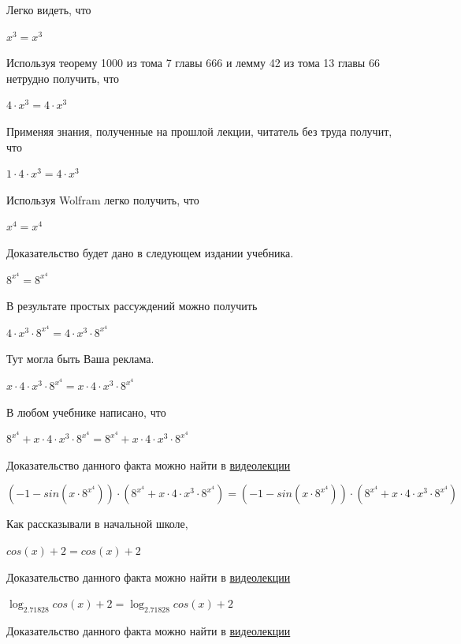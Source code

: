 \documentclass[12pt,a4paper,fleqn]{article}
\theoremstyle{definition}
\begin{document}
Легко видеть, что 

${ x }^{ 3 } = { x }^{ 3 }$

Используя теорему 1000 из тома 7 главы 666 и лемму 42 из тома 13 главы 66 нетрудно получить, что 

$ 4  \cdot { x }^{ 3 } =  4  \cdot { x }^{ 3 }$

Применяя знания, полученные на прошлой лекции, читатель без труда получит, что 

$ 1  \cdot  4  \cdot { x }^{ 3 } =  4  \cdot { x }^{ 3 }$

Используя Wolfram легко получить, что 

${ x }^{ 4 } = { x }^{ 4 }$

Доказательство будет дано в следующем издании учебника. 

${ 8 }^{{ x }^{ 4 }} = { 8 }^{{ x }^{ 4 }}$

В результате простых рассуждений можно получить 

$ 4  \cdot { x }^{ 3 } \cdot { 8 }^{{ x }^{ 4 }} =  4  \cdot { x }^{ 3 } \cdot { 8 }^{{ x }^{ 4 }}$

Тут могла быть Ваша реклама. 

$ x  \cdot  4  \cdot { x }^{ 3 } \cdot { 8 }^{{ x }^{ 4 }} =  x  \cdot  4  \cdot { x }^{ 3 } \cdot { 8 }^{{ x }^{ 4 }}$

В любом учебнике написано, что 

${ 8 }^{{ x }^{ 4 }} +  x  \cdot  4  \cdot { x }^{ 3 } \cdot { 8 }^{{ x }^{ 4 }} = { 8 }^{{ x }^{ 4 }} +  x  \cdot  4  \cdot { x }^{ 3 } \cdot { 8 }^{{ x }^{ 4 }}$

Доказательство данного факта можно найти в \href{https://www.youtube.com/watch?v=dQw4w9WgXcQ}{видеолекции} 

$( -1  - sin( x  \cdot { 8 }^{{ x }^{ 4 }})) \cdot ({ 8 }^{{ x }^{ 4 }} +  x  \cdot  4  \cdot { x }^{ 3 } \cdot { 8 }^{{ x }^{ 4 }}) = ( -1  - sin( x  \cdot { 8 }^{{ x }^{ 4 }})) \cdot ({ 8 }^{{ x }^{ 4 }} +  x  \cdot  4  \cdot { x }^{ 3 } \cdot { 8 }^{{ x }^{ 4 }})$

Как рассказывали в начальной школе, 

$cos( x ) +  2  = cos( x ) +  2 $

Доказательство данного факта можно найти в \href{https://www.youtube.com/watch?v=dQw4w9WgXcQ}{видеолекции} 

$\log_{ 2.71828 }{cos( x ) +  2 } = \log_{ 2.71828 }{cos( x ) +  2 }$

Доказательство данного факта можно найти в \href{https://www.youtube.com/watch?v=dQw4w9WgXcQ}{видеолекции} 
\end{document}
